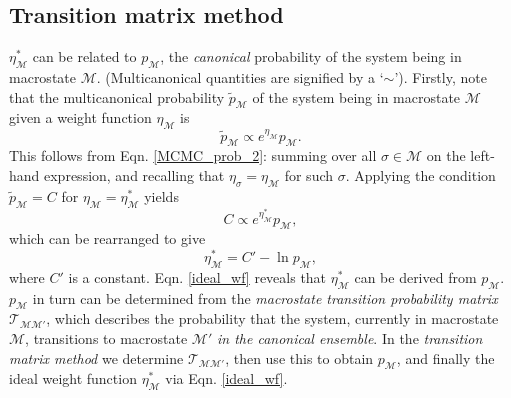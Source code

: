 \documentclass{report}
\begin{document}
\subsection{Transition matrix method}\label{sec:transition_matrix}
$\eta_{\mathcal{M}}^*$ can be related to $p_{\mathcal{M}}$, the \emph{canonical} probability of the system being in macrostate $\mathcal{M}$. (Multicanonical
quantities are signified by a `$\sim$'). Firstly, note that the multicanonical probability $\tilde{p}_{\mathcal{M}}$ of the system being in macrostate 
$\mathcal{M}$ given a weight function $\eta_{\mathcal{M}}$ is
\begin{equation}
\tilde{p}_{\mathcal{M}}\propto e^{\eta_{\mathcal{M}}}p_{\mathcal{M}}.
\end{equation}
This follows from Eqn. \eqref{MCMC_prob_2}: summing over all $\sigma\in\mathcal{M}$ on the left-hand expression, and recalling that 
$\eta_{\sigma}=\eta_{\mathcal{M}}$ for such $\sigma$. Applying the condition $\tilde{p}_{\mathcal{M}}=C$ for $\eta_{\mathcal{M}}=\eta_{\mathcal{M}}^*$ yields
\begin{equation}
C\propto e^{\eta^*_{\mathcal{M}}}p_{\mathcal{M}},
\end{equation}
which can be rearranged to give
\begin{equation}\label{ideal_wf}
\eta^*_{\mathcal{M}}=C'-\ln p_{\mathcal{M}},
\end{equation}
where $C'$ is a constant. Eqn. \eqref{ideal_wf} reveals that $\eta^*_{\mathcal{M}}$ can be derived from $p_{\mathcal{M}}$. $p_{\mathcal{M}}$ 
in turn can be determined from the \emph{macrostate transition probability matrix} $\mathcal{T}_{\mathcal{MM}'}$, which describes the probability that
the system, currently in macrostate $\mathcal{M}$, transitions to macrostate $\mathcal{M}'$ \emph{in the canonical ensemble}.
In the \emph{transition matrix method} \cite{Smith_1995,Fitzgerald_1999} we determine $\mathcal{T}_{\mathcal{MM}'}$, then use this to obtain
$p_{\mathcal{M}}$, and finally the ideal weight function $\eta_{\mathcal{M}}^*$ via Eqn. \eqref{ideal_wf}.
\end{document}
